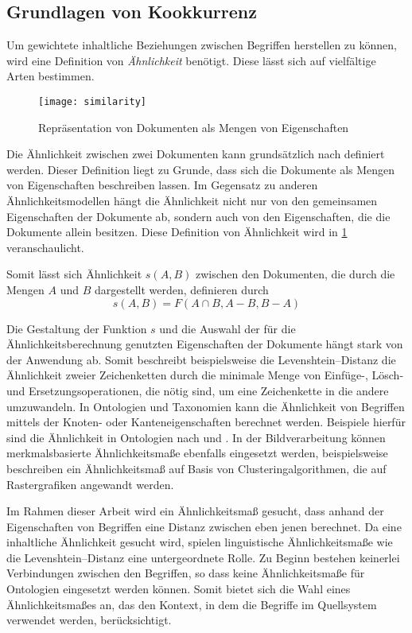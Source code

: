 \subsection{Grundlagen von Kookkurrenz}

Um gewichtete inhaltliche Beziehungen zwischen Begriffen herstellen zu können, wird eine Definition von \emph{Ähnlichkeit} benötigt. Diese lässt sich auf vielfältige Arten bestimmen.

\begin{figure}[h]
\centering
\texttt{[image: similarity]}
\caption{Repräsentation von Dokumenten als Mengen von Eigenschaften}
\label{fig:similarity}
\end{figure}

Die Ähnlichkeit zwischen zwei Dokumenten kann grundsätzlich nach \textcite{at1977} definiert werden. Dieser Definition liegt zu Grunde, dass sich die Dokumente als Mengen von Eigenschaften beschreiben lassen. Im Gegensatz zu anderen Ähnlichkeitsmodellen hängt die Ähnlichkeit nicht nur von den gemeinsamen Eigenschaften der Dokumente ab, sondern auch von den Eigenschaften, die die Dokumente allein besitzen. Diese Definition von Ähnlichkeit wird in \cref{fig:similarity} veranschaulicht.

Somit lässt sich Ähnlichkeit \(s(A,B)\) zwischen den Dokumenten, die durch die Mengen \(A\) und \(B\) dargestellt werden, definieren durch
\[s(A,B) = F(A \cap B, A-B, B-A)\]
\label{similarity}

Die Gestaltung der Funktion \(s\) und die Auswahl der für die Ähnlichkeitsberechnung genutzten Eigenschaften der Dokumente hängt stark von der Anwendung ab. Somit beschreibt beispielsweise die Levenshtein--Distanz \cite{vl1966} die Ähnlichkeit zweier Zeichenketten durch die minimale Menge von Einfüge-, Lösch- und Ersetzungsoperationen, die nötig sind, um eine Zeichenkette in die andere umzuwandeln. In Ontologien und Taxonomien kann die Ähnlichkeit von Begriffen mittels der Knoten- oder Kanteneigenschaften berechnet werden. Beispiele hierfür sind die Ähnlichkeit in Ontologien nach \textcite{pr1995} und \textcite{ps2002}. In der Bildverarbeitung können merkmalsbasierte Ähnlichkeitsmaße ebenfalls eingesetzt werden, beispielsweise beschreiben \textcite{ow2006} ein Ähnlichkeitsmaß auf Basis von Clusteringalgorithmen, die auf Rastergrafiken angewandt werden.

Im Rahmen dieser Arbeit wird ein Ähnlichkeitsmaß gesucht, dass anhand der Eigenschaften von Begriffen eine Distanz zwischen eben jenen berechnet. Da eine inhaltliche Ähnlichkeit gesucht wird, spielen linguistische Ähnlichkeitsmaße wie die Levenshtein--Distanz eine untergeordnete Rolle. Zu Beginn bestehen keinerlei Verbindungen zwischen den Begriffen, so dass keine Ähnlichkeitsmaße für Ontologien eingesetzt werden können. Somit bietet sich die Wahl eines Ähnlichkeitsmaßes an, das den Kontext, in dem die Begriffe im Quellsystem verwendet werden, berücksichtigt.

